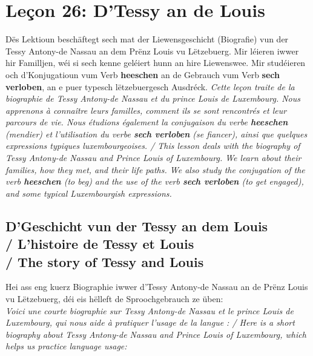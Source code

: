 \chapter{Leçon 26: D'Tessy an de Louis}

Dës Lektioun beschäftegt sech mat der Liewensgeschicht (Biografie) vun der Tessy Antony-de Nassau an dem Prënz Louis vu Lëtzebuerg. Mir léieren iwwer hir Familljen, wéi si sech kenne geléiert hunn an hire Liewenswee. Mir studéieren och d'Konjugatioun vum Verb \textbf{heeschen} an de Gebrauch vum Verb \textbf{sech verloben}, an e puer typesch lëtzebuergesch Ausdréck. \textit{Cette leçon traite de la biographie de Tessy Antony-de Nassau et du prince Louis de Luxembourg. Nous apprenons à connaître leurs familles, comment ils se sont rencontrés et leur parcours de vie. Nous étudions également la conjugaison du verbe \textbf{heeschen} (mendier) et l'utilisation du verbe \textbf{sech verloben} (se fiancer), ainsi que quelques expressions typiques luxembourgeoises. / This lesson deals with the biography of Tessy Antony-de Nassau and Prince Louis of Luxembourg. We learn about their families, how they met, and their life paths. We also study the conjugation of the verb \textbf{heeschen} (to beg) and the use of the verb \textbf{sech verloben} (to get engaged), and some typical Luxembourgish expressions.}

\vspace{1em}

\section[D'Geschicht vun der Tessy an dem Louis / L'histoire de Tessy et Louis / The story of Tessy and Louis]{D'Geschicht vun der Tessy an dem Louis \\/ L'histoire de Tessy et Louis \\/ The story of Tessy and Louis}

Hei ass eng kuerz Biographie iwwer d'Tessy Antony-de Nassau an de Prënz Louis vu Lëtzebuerg, déi eis hëlleft de Sproochgebrauch ze üben: \\
\textit{Voici une courte biographie sur Tessy Antony-de Nassau et le prince Louis de Luxembourg, qui nous aide à pratiquer l'usage de la langue : / Here is a short biography about Tessy Antony-de Nassau and Prince Louis of Luxembourg, which helps us practice language usage:}

\vspace{1em}

